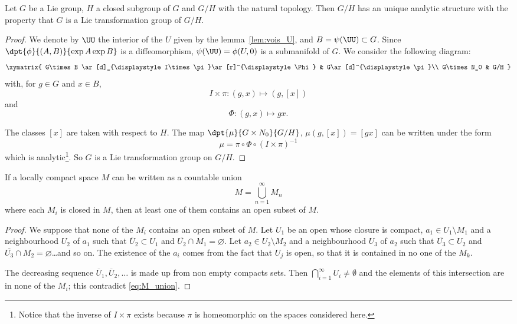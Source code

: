 \begin{theorem}\label{Helgason4.2}\label{tho:struc_anal}
	Let $G$ be a Lie group, $H$ a closed subgroup of $G$ and $G/H$ with the natural topology. Then $G/H$ has an unique analytic structure with the property that $G$ is a Lie transformation group of $G/H$.
\end{theorem}

\begin{proof}
	We denote by $\UU$ the interior of the $U$ given by the lemma~\ref{lem:vois_U}, and $B=\psi(\UU)\subset G$. Since $\dpt{\phi}{(A,B)}{\exp A\exp B}$ is a diffeomorphism, $\psi(\UU)=\phi(U,0)$ is a submanifold of $G$. We consider the following diagram:
	\[
		\xymatrix{
			G\times B  \ar[d]_{\displaystyle I\times\pi}\ar[r]^{\displaystyle\Phi}    &
			G\ar[d]^{\displaystyle\pi}\\
			G\times N_0 &                                                             G/H
		}\]
	with, for $g\in G$ and $x\in B$,
	\[
		I\times\pi\colon (g,x)\mapsto (g,[x])
	\]
	and
	\[
		\Phi\colon (g,x)\mapsto gx.
	\]

	\noindent The classes $[x]$ are taken with respect to $H$. The map $\dpt{\mu}{G\times N_0}{G/H}$, $\mu(g,[x])=[gx]$ can be written under the form
	\[
		\mu=\pi\circ\Phi\circ(I\times\pi)^{-1}
	\]
	which is analytic\footnote{Notice that the inverse of $I\times\pi$ exists because $\pi$ is homeomorphic on the spaces considered here.}. So $G$ is a Lie transformation group on $G/H$.

\end{proof}


\begin{lemma} \label{lem:categ}
	If a locally compact space $M$ can be written as a countable union
	\begin{equation}\label{eq:M_union}
		M=\bigcup_{n=1}^{\infty}M_n
	\end{equation}
	where each $M_i$ is closed in $M$, then at least one of them contains an open subset of $M$.
\end{lemma}

\begin{proof}
	We suppose that none of the $M_i$ contains an open subset of $M$. Let $U_1$ be an open whose closure is compact, $a_1\in U_1\setminus M_1$ and a neighbourhood $U_2$ of $a_1$ such that $\overline{U}_2\subset U_1$ and $\overline{U_2}\cap M_1=\varnothing$. Let $a_2\in U_2\setminus M_2$ and a neighbourhood $U_3$ of $a_2$ such that $\overline{U_3}\subset U_2$ and $\overline{U_3}\cap M_2=\varnothing$\ldots and so on. The existence of the $a_i$ comes from the fact that $U_j$ is open, so that it is contained in no one of the $M_k$.

	The decreasing sequence $\overline{U}_1,\overline{U}_2 ,\ldots$ is made up from non empty compacts sets. Then $\bigcap_{i=1}^{\infty}U_i\neq\emptyset$ and the elements of this intersection are in none of the $M_i$; this contradict \eqref{eq:M_union}.
\end{proof}


